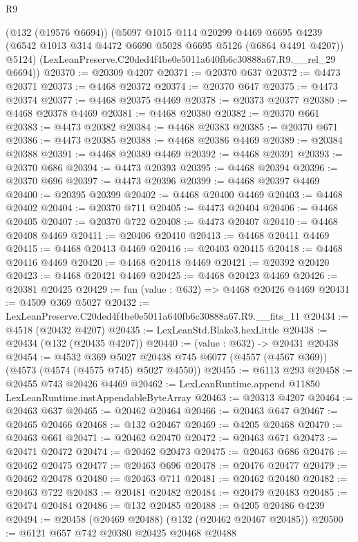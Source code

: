 \begin{lexlean}{R9}
\begin{coremodule}
      (@132 (@19576 @6694))
      (@5097
        @1015
        @114
        @20299
        @4469
        @6695
        @4239
        (@6542 @1013 @314 @4472 @6690 @5028 @6695 @5126 (@6864 @4491 @4207))
        @5124)
      (LexLeanPreserve.C20ded4f4be0e5011a640fb6c30888a67.R9.__rel_29 @6694))
@20370 := @20309 @4207
@20371 := @20370 @637
@20372 := @4473 @20371
@20373 := @4468 @20372
@20374 := @20370 @647
@20375 := @4473 @20374
@20377 := @4468 @20375 @4469
@20378 := @20373 @20377
@20380 := @4468 @20378 @4469
@20381 := @4468 @20380
@20382 := @20370 @661
@20383 := @4473 @20382
@20384 := @4468 @20383
@20385 := @20370 @671
@20386 := @4473 @20385
@20388 := @4468 @20386 @4469
@20389 := @20384 @20388
@20391 := @4468 @20389 @4469
@20392 := @4468 @20391
@20393 := @20370 @686
@20394 := @4473 @20393
@20395 := @4468 @20394
@20396 := @20370 @696
@20397 := @4473 @20396
@20399 := @4468 @20397 @4469
@20400 := @20395 @20399
@20402 := @4468 @20400 @4469
@20403 := @4468 @20402
@20404 := @20370 @711
@20405 := @4473 @20404
@20406 := @4468 @20405
@20407 := @20370 @722
@20408 := @4473 @20407
@20410 := @4468 @20408 @4469
@20411 := @20406 @20410
@20413 := @4468 @20411 @4469
@20415 := @4468 @20413 @4469
@20416 := @20403 @20415
@20418 := @4468 @20416 @4469
@20420 := @4468 @20418 @4469
@20421 := @20392 @20420
@20423 := @4468 @20421 @4469
@20425 := @4468 @20423 @4469
@20426 := @20381 @20425
@20429 := fun (value : @632) => @4468 @20426 @4469
@20431 := @4509 @369 @5027
@20432 := LexLeanPreserve.C20ded4f4be0e5011a640fb6c30888a67.R9.__fits_11
@20434 := @4518 (@20432 @4207)
@20435 := LexLeanStd.Blake3.hexLittle
@20438 := @20434 (@132 (@20435 @4207))
@20440 := (value : @632) -> @20431 @20438
@20454 := @4532
    @369
    @5027
    @20438
    @745
    @6077
    (@4557 (@4567 @369))
    (@4573 (@4574 (@4575 @745) @5027 @4550))
@20455 := @6113 @293
@20458 := @20455 @743 @20426 @4469
@20462 := LexLeanRuntime.append @11850 LexLeanRuntime.instAppendableByteArray
@20463 := @20313 @4207
@20464 := @20463 @637
@20465 := @20462 @20464
@20466 := @20463 @647
@20467 := @20465 @20466
@20468 := @132 @20467
@20469 := @4205 @20468
@20470 := @20463 @661
@20471 := @20462 @20470
@20472 := @20463 @671
@20473 := @20471 @20472
@20474 := @20462 @20473
@20475 := @20463 @686
@20476 := @20462 @20475
@20477 := @20463 @696
@20478 := @20476 @20477
@20479 := @20462 @20478
@20480 := @20463 @711
@20481 := @20462 @20480
@20482 := @20463 @722
@20483 := @20481 @20482
@20484 := @20479 @20483
@20485 := @20474 @20484
@20486 := @132 @20485
@20488 := @4205 @20486 @4239
@20494 := @20458 (@20469 @20488) (@132 (@20462 @20467 @20485))
@20500 := @6121 @657 @742 @20380 @20425 @20468 @20488

\end{coremodule}
\end{lexlean}
